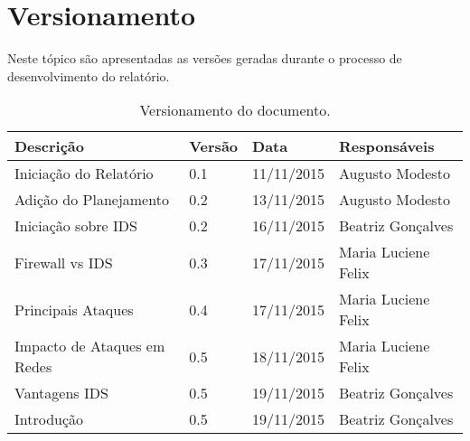 \chapter[Versionamento]{Versionamento}
\label{chap:versionamento}
	Neste tópico são apresentadas as versões geradas durante o processo de desenvolvimento do relatório.
	
	\label{subsubsec:versionamento_talbe}
		\begin{table}[h]
			\centering
			\begin{tabular}{|p{6cm}|p{1.5cm}|p{2.5cm}|p{4cm}|}
				
				\hline
				
				Descrição & Versão & Data & Responsáveis \\ \hline
				Iniciação do Relatório & 0.1 & 11/11/2015 & Augusto Modesto \\ \hline
				Adição do Planejamento & 0.2 & 13/11/2015 & Augusto Modesto \\ \hline
				Iniciação sobre IDS & 0.2 & 16/11/2015 & Beatriz Gonçalves \\ \hline
				Firewall vs IDS & 0.3 & 17/11/2015 & Maria Luciene Felix \\ \hline
				Principais Ataques & 0.4 & 17/11/2015 & Maria Luciene Felix \\ \hline
				Impacto de Ataques em Redes & 0.5 & 18/11/2015 & Maria Luciene Felix \\ \hline
				Vantagens IDS & 0.5 & 19/11/2015 & Beatriz Gonçalves \\ \hline				
				Introdução & 0.5 & 19/11/2015 & Beatriz Gonçalves \\ \hline		



				
			\end{tabular}
			\caption[Versionamento do Documento]{Versionamento do documento.}
			\label{tab:versionamento_tabl}
		\end{table}

